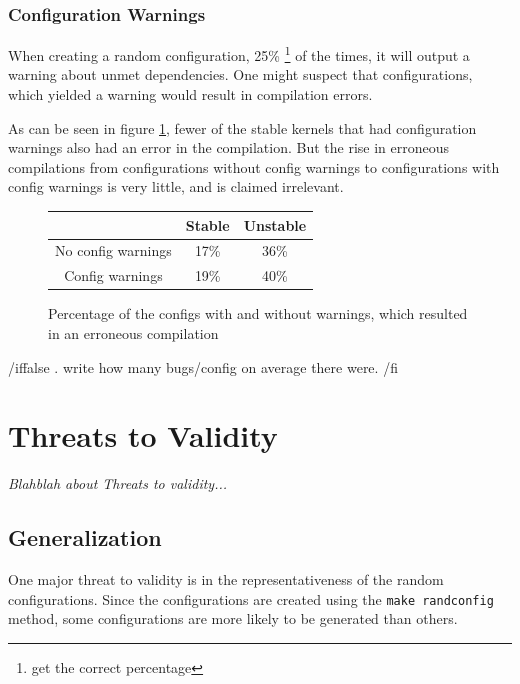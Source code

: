\documentclass[a4paper,11pt]{report}
\newcommand{\textcode}[1]{
    \fboxsep=1pt
    \texttt{\colorbox{gray!20}{#1}}
}
\newcommand{\figa}{
    \begin{figure}[!htpb]
    \centering
}
\newcommand{\figb}[2]{
    \caption{#1}
    \label{#2}
    \end{figure}
}
\begin{document}
    \subsection{Configuration Warnings}
When creating a random configuration, 25\%
    \footnote{get the correct percentage}
of the times, it will output a warning about unmet dependencies. One might
suspect that configurations, which yielded a warning would result in
compilation errors. 

As can be seen in figure \ref{tbl:confwarns}, fewer of the stable kernels that 
had configuration warnings also had an error in the compilation. But the rise 
in erroneous compilations from configurations without config warnings to 
configurations with config warnings is very little, and is claimed irrelevant.

\figa
    \begin{tabular}{c|c|c}
    \hline
    \hline
        & \textbf{Stable} & \textbf{Unstable} \\
    \hline
    No config warnings & 17\% & 36\%\\
    Config warnings & 19\% & 40\%\\
    \hline
    \hline
    \end{tabular}
\figb{Percentage of the configs with and without warnings, which resulted in an 
    erroneous compilation}{tbl:confwarns}

/iffalse
  . write how many bugs/config on average there were.
/fi


\newpage
    \chapter{Threats to Validity}
\label{ch:ttv}

\emph{Blahblah about Threats to validity...}

\section{Generalization}
\label{sec:gen}

One major threat to validity is in the representativeness of the random 
configurations. Since the configurations are created using the \textcode{make 
randconfig} method, some configurations are more likely to be generated than 
others.
\end{document}
